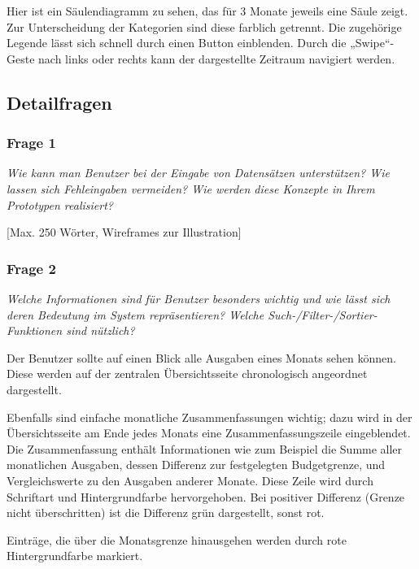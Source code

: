 Hier ist ein S\"aulendiagramm zu sehen, das für 3 Monate jeweils eine S\"aule zeigt. Zur Unterscheidung der Kategorien sind diese farblich getrennt. Die zugeh\"orige Legende lässt sich schnell durch einen Button einblenden. Durch die „Swipe“-Geste nach links oder rechts kann der dargestellte Zeitraum navigiert werden.

\subsection{Detailfragen}

\subsubsection{Frage 1}

\emph{Wie kann man Benutzer bei der Eingabe von Datensätzen unterstützen? Wie lassen sich Fehleingaben vermeiden? Wie werden diese Konzepte in Ihrem Prototypen realisiert?}

\vspace{2mm}


[Max. 250 Wörter, Wireframes zur Illustration]



\subsubsection{Frage 2}

\emph{Welche Informationen sind für Benutzer besonders wichtig und wie lässt sich deren Bedeutung im System repräsentieren? Welche Such-/Filter-/Sortier-Funktionen sind nützlich?}

\vspace{2mm}

Der Benutzer sollte auf einen Blick alle Ausgaben eines Monats sehen k\"onnen. Diese
werden auf der zentralen \"Ubersichtsseite chronologisch angeordnet dargestellt.

Ebenfalls sind einfache monatliche Zusammenfassungen wichtig; dazu wird in der
\"Ubersichtsseite am Ende jedes Monats eine Zusammenfassungszeile eingeblendet.
Die Zusammenfassung enth\"alt Informationen wie zum Beispiel die Summe aller monatlichen
Ausgaben, dessen Differenz zur festgelegten Budgetgrenze, und Vergleichswerte zu den Ausgaben
anderer Monate. Diese Zeile wird durch Schriftart und Hintergrundfarbe hervorgehoben.
Bei positiver Differenz (Grenze nicht \"uberschritten) ist die Differenz gr\"un dargestellt,
sonst rot.

Eintr\"age, die \"uber die Monatsgrenze hinausgehen werden durch rote Hintergrundfarbe
markiert.


